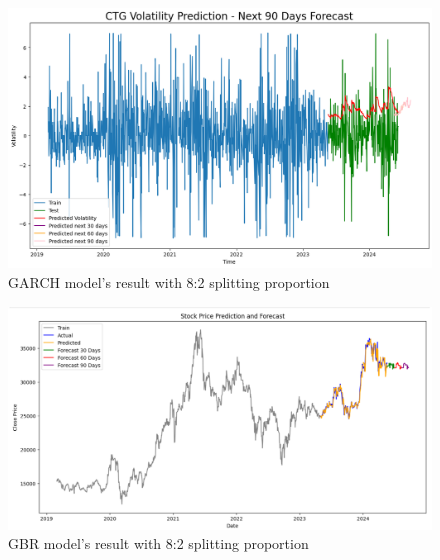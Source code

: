 \documentclass{ieeeojies}
\begin{document}
\begin{figure}[H]
  \centering
  \begin{minipage}{0.8\linewidth}
    \centering
    \includegraphics[width=\linewidth]{bibliography/CTG-GARCH-8-2.png}
    \caption{GARCH model's result with 8:2 splitting proportion}
    \label{fig8}
  \end{minipage}
\end{figure}
\begin{figure}[H]
  \centering
  \begin{minipage}{0.8\linewidth}
    \centering
    \includegraphics[width=\linewidth]{bibliography/CTG-GBR-8-2.png}
    \caption{GBR model's result with 8:2 splitting proportion}
    \label{fig25}
  \end{minipage}
\end{figure}
\end{document}
